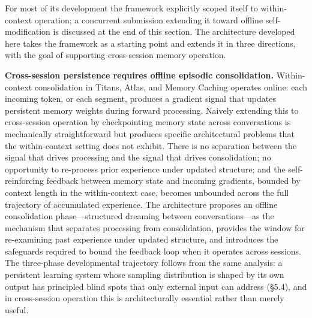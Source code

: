 \documentclass[11pt]{article}
\begin{document}
For most of its development the framework explicitly scoped itself to within-context operation; a concurrent submission extending it toward offline self-modification is discussed at the end of this section. The architecture developed here takes the framework as a starting point and extends it in three directions, with the goal of supporting cross-session memory operation.

\textbf{Cross-session persistence requires offline episodic consolidation.} Within-context consolidation in Titans, Atlas, and Memory Caching operates online: each incoming token, or each segment, produces a gradient signal that updates persistent memory weights during forward processing. Naively extending this to cross-session operation by checkpointing memory state across conversations is mechanically straightforward but produces specific architectural problems that the within-context setting does not exhibit. There is no separation between the signal that drives processing and the signal that drives consolidation; no opportunity to re-process prior experience under updated structure; and the self-reinforcing feedback between memory state and incoming gradients, bounded by context length in the within-context case, becomes unbounded across the full trajectory of accumulated experience. The architecture proposes an offline consolidation phase---structured dreaming between conversations---as the mechanism that separates processing from consolidation, provides the window for re-examining past experience under updated structure, and introduces the safeguards required to bound the feedback loop when it operates across sessions. The three-phase developmental trajectory follows from the same analysis: a persistent learning system whose sampling distribution is shaped by its own output has principled blind spots that only external input can address (\S 5.4), and in cross-session operation this is architecturally essential rather than merely useful.
\end{document}
